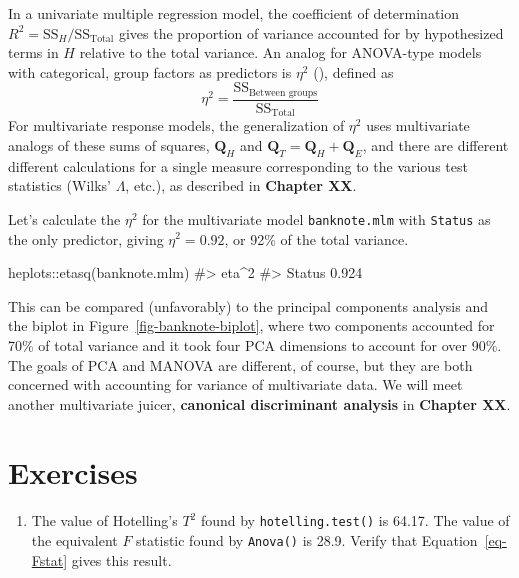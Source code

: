 \documentclass[
  letterpaper,
  10pt,
  krantz2]{krantz}
\makeatletter
\newenvironment{Shaded}{\begin{snugshade}}{\end{snugshade}}
\newcommand{\CommentTok}[1]{\textcolor[rgb]{0.37,0.37,0.37}{#1}}
\newcommand{\FunctionTok}[1]{\textcolor[rgb]{0.28,0.35,0.67}{#1}}
\newcommand{\NormalTok}[1]{\textcolor[rgb]{0.00,0.23,0.31}{#1}}
\newcommand{\SpecialCharTok}[1]{\textcolor[rgb]{0.37,0.37,0.37}{#1}}
\providecommand{\tightlist}{%
  \setlength{\itemsep}{0pt}\setlength{\parskip}{0pt}}\usepackage{longtable,booktabs,array}
\newenvironment{kframe}{%
  \medskip{}
  \setlength{\fboxsep}{.8em}
  \def\at@end@of@kframe{}%
  \ifinner\ifhmode%
  \def\at@end@of@kframe{\end{minipage}}%
  \begin{minipage}{\columnwidth}%
  \fi\fi%
  \def\FrameCommand##1{\hskip\@totalleftmargin \hskip-\fboxsep
  \colorbox{shadecolor}{##1}\hskip-\fboxsep
      \hskip-\linewidth \hskip-\@totalleftmargin \hskip\columnwidth}%
  \MakeFramed {\advance\hsize-\width
    \@totalleftmargin\z@ \linewidth\hsize
    \@setminipage}}%
{\par\unskip\endMakeFramed%
  \at@end@of@kframe}
\renewenvironment{Shaded}{\begin{kframe}}{\end{kframe}}
\makeatother
\begin{document}
In a univariate multiple regression model, the coefficient of
determination \(R^2 = \text{SS}_H / \text{SS}_\text{Total}\) gives the
proportion of variance accounted for by hypothesized terms in \(H\)
relative to the total variance. An analog for ANOVA-type models with
categorical, group factors as predictors is \(\eta^2\)
(), defined as \[
\eta^2 = \frac{\text{SS}_\text{Between groups}}{\text{SS}_\text{Total}}
\] For multivariate response models, the generalization of \(\eta^2\)
uses multivariate analogs of these sums of squares, \(\mathbf{Q}_H\) and
\(\mathbf{Q}_T = \mathbf{Q}_H + \mathbf{Q}_E\), and there are different
different calculations for a single measure corresponding to the various
test statistics (Wilks' \(\Lambda\), etc.), as described in
\textbf{Chapter XX}.

Let's calculate the \(\eta^2\) for the multivariate model
\texttt{banknote.mlm} with \texttt{Status} as the only predictor, giving
\(\eta^2 = 0.92\), or 92\% of the total variance.

\begin{Shaded}
\begin{Highlighting}[]
\NormalTok{heplots}\SpecialCharTok{::}\FunctionTok{etasq}\NormalTok{(banknote.mlm)}
\CommentTok{\#\textgreater{}        eta\^{}2}
\CommentTok{\#\textgreater{} Status 0.924}
\end{Highlighting}
\end{Shaded}

This can be compared (unfavorably) to the principal components analysis
and the biplot in Figure~\ref{fig-banknote-biplot}, where two components
accounted for 70\% of total variance and it took four PCA dimensions to
account for over 90\%. The goals of PCA and MANOVA are different, of
course, but they are both concerned with accounting for variance of
multivariate data. We will meet another multivariate juicer,
\textbf{canonical discriminant analysis} in \textbf{Chapter XX}.

\section{Exercises}\label{exercises}

\begin{enumerate}
\def\labelenumi{\arabic{enumi}.}
\tightlist
\item
  The value of Hotelling's \(T^2\) found by \texttt{hotelling.test()} is
  64.17. The value of the equivalent \(F\) statistic found by
  \texttt{Anova()} is 28.9. Verify that Equation~\ref{eq-Fstat} gives
  this result.
\end{enumerate}
\end{document}
